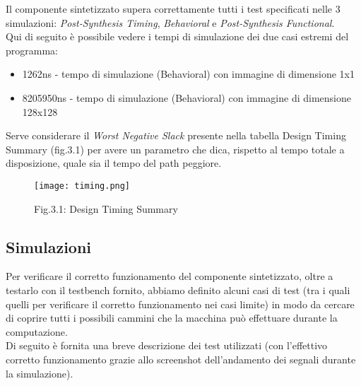 \documentclass[12pt, table, xcdraw]{article}
\begin{document}
Il componente sintetizzato supera correttamente tutti i test specificati nelle 3 simulazioni:
\emph{Post-Synthesis Timing}, \emph{Behavioral} e \emph{Post-Synthesis Functional}.\\
Qui di seguito è possibile vedere i tempi di simulazione dei due casi estremi del programma:
\begin{itemize}
\item 1262ns - tempo di simulazione (Behavioral) con immagine di dimensione 1x1
\item 8205950ns - tempo di simulazione (Behavioral) con immagine di dimensione 128x128
\end{itemize}

Serve considerare il \emph{Worst Negative Slack} presente nella tabella Design Timing Summary (fig.3.1)
per avere un parametro che dica, rispetto al tempo totale a disposizione, quale sia il tempo del
path peggiore.
\begin{figure}[h!]
\begin{center}
  \texttt{[image: timing.png]}
\caption*{Fig.3.1: Design Timing Summary}
\end{center}
\end{figure}
\FloatBarrier


\subsection{Simulazioni}
Per verificare il corretto funzionamento del componente sintetizzato, oltre a testarlo con il testbench fornito, abbiamo definito alcuni casi di test (tra i quali quelli per verificare il corretto funzionamento nei casi limite) in modo da cercare di coprire tutti i possibili cammini che la macchina può effettuare durante la computazione.\\
Di seguito è fornita una breve descrizione dei test utilizzati (con l'effettivo corretto funzionamento grazie allo screenshot dell’andamento dei segnali durante la simulazione).\\
\end{document}
